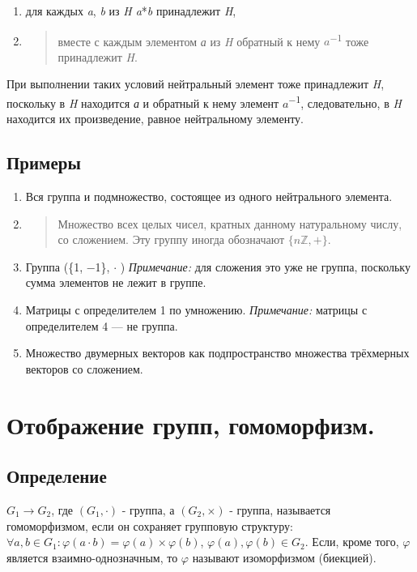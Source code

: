 \documentclass[12pt]{article}
\begin{document}
\begin{enumerate}
    \def\labelenumi{\arabic{enumi}.}
    \item
          для каждых \emph{a}, \emph{b} из \emph{H a}*\emph{b} принадлежит
          \emph{H},
    \item
          \begin{quote}
              вместе с каждым элементом \emph{а} из \emph{H} обратный к нему
              $a$\textsuperscript{−1} тоже принадлежит \emph{H}.
          \end{quote}
\end{enumerate}

При выполнении таких условий нейтральный элемент тоже принадлежит
\emph{H}, поскольку в \emph{H} находится \emph{а} и обратный к нему
элемент $a$\textsuperscript{−1}, следовательно, в \emph{H} находится их
произведение, равное нейтральному элементу.

\subsection{Примеры}

\begin{enumerate}
    \item
          Вся группа и подмножество, состоящее из одного нейтрального элемента.
    \item
          \begin{quote}
              Множество всех целых чисел, кратных данному натуральному числу, со
              сложением. Эту группу иногда обозначают $\{n\mathbb{Z}, +\}$.
          \end{quote}
    \item
          Группа (\{1, −1\}, $\cdot$ ) \emph{Примечание:} для сложения это уже не группа, поскольку сумма элементов не лежит в группе.
    \item
          Матрицы с определителем 1 по умножению. \emph{Примечание:} матрицы с
          определителем 4 --- не группа.
    \item
          Множество двумерных векторов как подпространство множества трёхмерных
          векторов со сложением.
\end{enumerate}

\section{Отображение групп, гомоморфизм.}
\subsection{Определение}
$G_1 \rightarrow G_2$, где $(G_1,\cdot)$ - группа, а $(G_2,\times)$ - группа, называется гомоморфизмом, если он сохраняет групповую структуру: $\forall a,b\in G_1: \varphi(a\cdot b)=\varphi(a)\times\varphi(b)$, $\varphi(a),\varphi(b)\in G_2$. Если, кроме того, $\varphi$ является взаимно-однозначным, то $\varphi$ называют изоморфизмом (биекцией).
\end{document}
